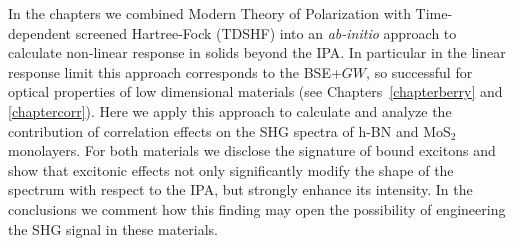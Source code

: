 In the chapters we combined Modern Theory of Polarization\cite{RevModPhys.66.899} with Time-dependent screened Hartree-Fock (TDSHF)\cite{strinati} into an \emph{ab-initio} approach to calculate non-linear response in solids beyond the IPA. In particular in the linear response limit this approach corresponds to the BSE+$GW$,\cite{attaccalite} so successful for optical properties of low dimensional materials (see Chapters~\ref{chapterberry} and \ref{chaptercorr}). 
Here we apply this approach to calculate and analyze the contribution of correlation effects on the SHG spectra of h-BN and MoS$_2$ monolayers. For both materials we disclose the signature of bound excitons and show that excitonic effects not only significantly modify the shape of the spectrum with respect to the IPA, but strongly enhance its intensity. In the conclusions we comment how this finding may open the possibility of engineering the SHG signal in these materials. 





